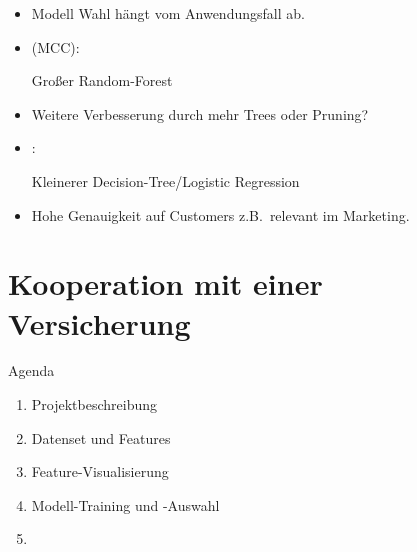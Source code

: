 \begin{frame}
\centering
{}
{
\begin{itemize}
\item Modell Wahl hängt vom Anwendungsfall ab.
\item {} (MCC):

 Großer Random-Forest

\item Weitere Verbesserung durch mehr Trees oder Pruning? 
 
\item {}:

Kleinerer Decision-Tree/Logistic Regression
\item Hohe Genauigkeit auf Customers z.B.\ relevant im Marketing.
\end{itemize}
}
\end{frame}

\section{Kooperation mit einer Versicherung}

\begin{frame}{Agenda}
\centering
\myBlock[0.6]{}
{
\begin{enumerate}
\item Projektbeschreibung
\item Datenset und Features
\item Feature-Visualisierung
\item Modell-Training und -Auswahl
\item {}
\end{enumerate}
}
\end{frame}

